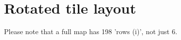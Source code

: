 \documentclass{article}
\begin{document}
\section{Rotated tile layout}
Please note that a full map has 198 'rows (i)', not just 6.
%
%
%
%
%
%
%
%
%
%
\end{document}
